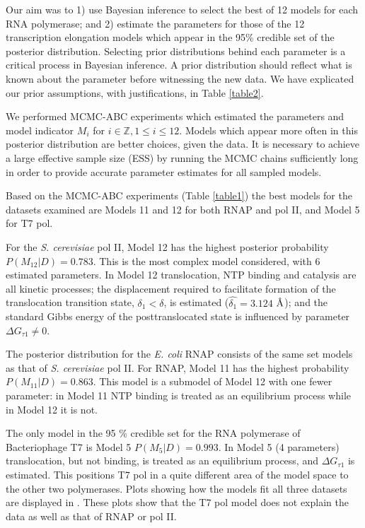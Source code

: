 \documentclass[10pt,letterpaper]{article}
\newcommand{\angstrom}{\mbox{\normalfont\AA}}
\begin{document}
Our aim was to 1) use Bayesian inference to select the best of 12 models for each RNA polymerase; and 2) estimate the parameters for those of the 12 transcription elongation models which appear in the 95\% credible set of the posterior distribution. Selecting prior distributions behind each parameter is a  critical process in Bayesian inference. A prior distribution should reflect what is known about the parameter before witnessing the new data. We have explicated our prior assumptions, with justifications, in Table \ref{table2}. \par


We performed MCMC-ABC experiments which estimated the parameters and model indicator $M_i$ for $i \in \mathbb{Z}, 1 \leq i \leq 12$. Models which appear more often in this posterior distribution are better choices, given the data. It is necessary to achieve a large effective sample size (ESS) by running the MCMC chains sufficiently long in order to provide accurate parameter estimates for all sampled models.  \par   





Based on the MCMC-ABC experiments (Table \ref{table1}) the best models for the datasets examined are Models 11 and 12 for both RNAP and pol II, and Model 5 for T7 pol. 

For the {\it S. cerevisiae} pol II, Model 12 has the highest posterior probability $P(M_{12}|D) = 0.783$. This is the most complex model considered, with 6 estimated parameters. In Model 12 translocation, NTP binding and catalysis are all kinetic processes; the displacement required to facilitate formation of the translocation transition state, $\delta_1 < \delta$, is estimated ($\hat{\delta_1} = 3.124$ $\angstrom$); and the standard Gibbs energy of the posttranslocated state is influenced by parameter $\Delta G_{\tau 1} \neq 0$. \par

The posterior distribution for the {\it E. coli} RNAP  consists of the same set models as that of {\it S. cerevisiae} pol II. For RNAP, Model 11 has the highest probability $P(M_{11}|D) = 0.863$. This model is a submodel of Model 12 with one fewer parameter: in Model 11 NTP binding is treated as an equilibrium process while in Model 12 it is not. \par


The only model in the 95 \% credible set for the RNA polymerase of Bacteriophage T7 is Model 5 $P(M_{5}|D) = 0.993$. In Model 5 (4 parameters) translocation, but not binding, is treated as an equilibrium process, and $\Delta G_{\tau 1}$ is estimated. This positions T7 pol in a quite different area of the model space to the other two polymerases. Plots showing how the models fit  all three datasets are displayed in . These plots show that the T7 pol model does not explain the data as well as that of RNAP or pol II. \par
\end{document}

